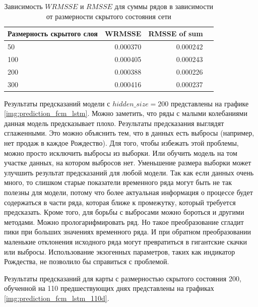 \begin{table}
    \caption{Зависимость $ WRMSSE $ и $ RMSSE $ для суммы рядов в зависимости от размерности скрытого состояния сети }
    \centering
    \begin{tabular}{|l|r||r|r|}
        \hline
            Размерность скрытого слоя &   WRMSSE & RMSSE of sum \\
        \hline
            50                         & 0.000370 & 0.000242 \\
            100                        & 0.000405 & 0.000243 \\
            200                        & 0.000388 & 0.000226 \\
            300                        & 0.000416 & 0.000237 \\
        \hline
    \end{tabular}
    \label{tbl:rmsse_fcm_lstm}
\end{table}

Результаты предсказаний модели с $ hidden\_size = 200 $ представлены на графике \ref{img:prediction_fcm_lstm}.
Можно заметить, что ряды с малыми колебаниями данная модель предсказывает плохо.
Результаты предсказания выглядят сглаженными. Это можно объяснить тем, что
в данных есть выбросы (например, нет продаж в каждое Рождество).
Для того, чтобы избежать этой проблемы, можно просто исключить  выбросы из выборки.
Или обучить модель на том участке данных, на котором выбросов нет.
Уменьшение размера выборки может улучшить результат предсказаний для любой модели.
Так как если данных очень много, то слишком старые показатели временного ряда
могут быть не так полезны для модели, потому что более актуальная информация
о процессе будет содержаться в части ряда, которая ближе к промежутку, который
требуется предсказать.
Кроме того, для борьбы с выбросами можно бороться и другими методами.
Можно прологарифмировать ряд. Но такое преобразование сгладит пики при больших значениях
временного ряда. И при обратном преобразовании маленькие отклонения исходного ряда
могут превратиться в гигантские скачки или выбросы.
Использование экзогенных параметров, таких как индикатор Рождества, не позволило бы
справиться с проблемой.

Результаты предсказаний для карты с размерностью скрытого состояния 200, обученной на 110 предшествующих днях
представлены на графиках \ref{img:prediction_fcm_lstm_110d}.

